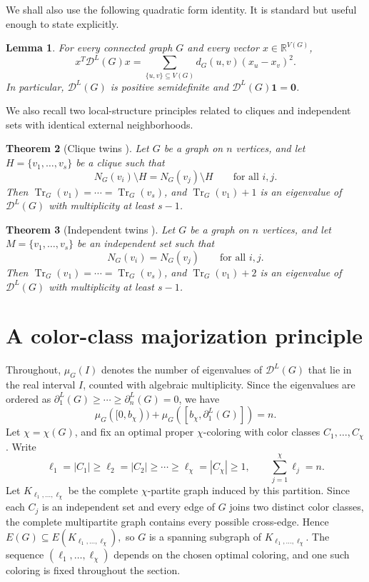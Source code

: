 \documentclass[12pt]{article}
\newcommand{\DL}{\mathcal{D}^{L}}
\newcommand{\Tr}{\operatorname{Tr}}
\theoremstyle{plain}
\newtheorem{theorem}{Theorem}[section]
\newtheorem{lemma}[theorem]{Lemma}
\theoremstyle{definition}
\begin{document}
\medskip
\noindent  We shall also use the following quadratic form identity. It is standard but useful enough to state explicitly.
\begin{lemma}\label{lem:quadratic-form}
For every connected graph $G$ and every vector $x\in\mathbb{R}^{V(G)}$,
\[
    x^{T}\DL(G)x=\sum_{\{u,v\}\subseteq V(G)} d_G(u,v)(x_u-x_v)^2.
\]
In particular, $\DL(G)$ is positive semidefinite and $\DL(G)\mathbf{1}=\mathbf{0}$.
\end{lemma}



\medskip
\noindent  We also recall two local-structure principles related to cliques and independent sets with identical external neighborhoods.

\begin{theorem}[Clique twins \cite{AouchicheHansen2013}]\label{thm:clique-twins}
Let $G$ be a graph on $n$ vertices, and let $H=\{v_1,\dots,v_s\}$ be a clique such that
\[
    N_G(v_i)\setminus H=N_G(v_j)\setminus H\qquad\text{for all }i,j.
\]
Then $\Tr_G(v_1)=\cdots=\Tr_G(v_s)$, and $\Tr_G(v_1)+1$ is an eigenvalue of $\DL(G)$ with multiplicity at least $s-1$.
\end{theorem}

\begin{theorem}[Independent twins \cite{AouchicheHansen2013}]\label{thm:indep-twins}
Let $G$ be a graph on $n$ vertices, and let $M=\{v_1,\dots,v_s\}$ be an independent set such that
\[
    N_G(v_i)=N_G(v_j)\qquad\text{for all }i,j.
\]
Then $\Tr_G(v_1)=\cdots=\Tr_G(v_s)$, and $\Tr_G(v_1)+2$ is an eigenvalue of $\DL(G)$ with multiplicity at least $s-1$.
\end{theorem}

\section{A color-class majorization principle}\label{section 3}

Throughout, $\mu_G(I)$ denotes the number of eigenvalues of $\DL(G)$ that lie in the real interval $I$, counted with algebraic
multiplicity. Since the eigenvalues are ordered as
$\partial^{L}_1(G)\ge\cdots\ge\partial^{L}_n(G)=0$, we have
\begin{equation}\label{eq:count-identity}
    \mu_G([0,b_\chi)) + \mu_G([b_\chi,\partial^{L}_1(G)])=n.
\end{equation}
 Let $\chi=\chi(G)$, and fix an optimal proper $\chi$-coloring with color classes
$C_1,\dots,C_\chi$. Write
\[
    \ell_1=|C_1|\ge \ell_2=|C_2|\ge\cdots\ge\ell_\chi=|C_\chi|\ge 1,
    \qquad \sum_{j=1}^{\chi}\ell_j=n.
\]
Let $K_{\ell_1,
\dots,
\ell_\chi}$ be the complete $\chi$-partite graph induced by this partition. Since each $C_j$ is an
independent set and every edge of $G$ joins two distinct color classes, the complete multipartite graph contains every possible
cross-edge. Hence $E(G)\subseteq E(K_{\ell_1,\dots,\ell_\chi}),$ so $G$ is a spanning subgraph of $K_{\ell_1,\dots,\ell_\chi}$. The sequence $(\ell_1,
\dots,
\ell_\chi)$ depends on the chosen
optimal coloring, and one such coloring is fixed throughout the section.
\end{document}
